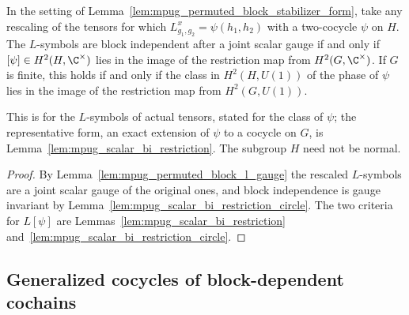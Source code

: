 \begin{lemma}
    \label{lem:mpug_permuted_block_bi_extension}
    \leanok
    In the setting of Lemma~\ref{lem:mpug_permuted_block_stabilizer_form},
    take any rescaling of the tensors for which $L^x_{g_1,g_2}=\psi(h_1,h_2)$
    with a two-cocycle $\psi$ on $H$. The $L$-symbols are block independent
    after a joint scalar gauge if and only if $[\psi]\in H^2(H,\C^\times)$
    lies in the image of the restriction map from $H^2(G,\C^\times)$. If $G$
    is finite, this holds if and only if the class in $H^2(H,U(1))$ of the
    phase of $\psi$ lies in the image of the restriction map from
    $H^2(G,U(1))$.

    This is \cite[lines~7042--7064]{FrancoRubio2025MPUGauging} for the
    $L$-symbols of actual tensors, stated for the class of $\psi$; the
    representative form, an exact extension of $\psi$ to a cocycle on $G$, is
    Lemma~\ref{lem:mpug_scalar_bi_restriction}. The subgroup $H$ need not be
    normal.
\end{lemma}

\begin{proof}\leanok
    By Lemma~\ref{lem:mpug_permuted_block_l_gauge} the rescaled $L$-symbols
    are a joint scalar gauge of the original ones, and block independence is
    gauge invariant by Lemma~\ref{lem:mpug_scalar_bi_restriction_circle}.
    The two criteria for $L[\psi]$ are
    Lemmas~\ref{lem:mpug_scalar_bi_restriction}
    and~\ref{lem:mpug_scalar_bi_restriction_circle}.
\end{proof}

\subsection{Generalized cocycles of block-dependent cochains}

